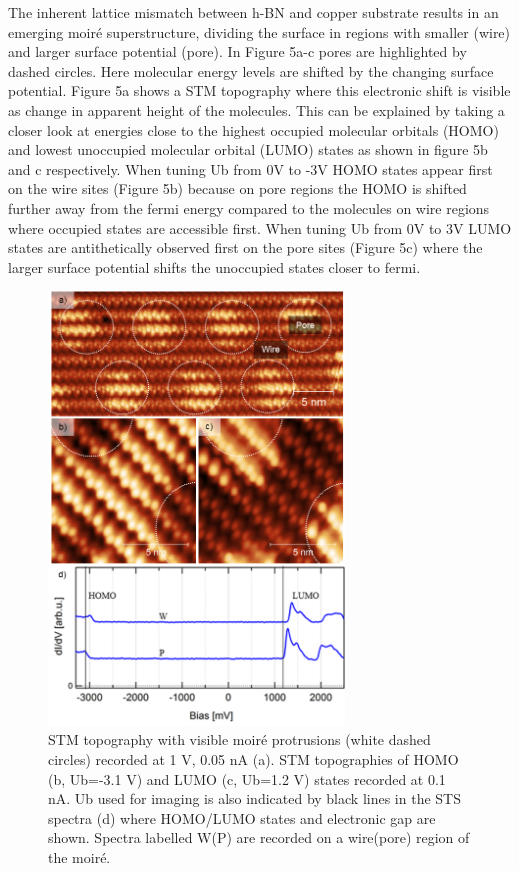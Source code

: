 The inherent lattice mismatch between h-BN and copper substrate results in an emerging moiré superstructure\cite{}, dividing the surface in regions with smaller (wire) and larger surface potential (pore)\cite{}. In Figure 5a-c pores are highlighted by dashed circles. Here molecular energy levels are shifted by the changing surface potential.\cite{} Figure 5a shows a STM topography where this electronic shift is visible as change in apparent height of the molecules. This can be explained by taking a closer look at energies close to the highest occupied molecular orbitals (HOMO) and lowest unoccupied molecular orbital (LUMO) states as shown in figure 5b and c respectively. When tuning Ub from 0V to -3V HOMO states appear first on the wire sites (Figure 5b) because on pore regions the HOMO is shifted further away from the fermi energy compared to the molecules on wire regions where occupied states are accessible first. When tuning Ub from 0V to 3V LUMO states are antithetically observed first on the pore sites (Figure 5c) where the larger surface potential shifts the unoccupied states closer to fermi.

\begin{figure} \centering
	\includegraphics[width=0.7\textwidth]{./images/paper/helicene/fig5}
	\caption{STM topography with visible moiré protrusions (white dashed circles) recorded at 1 V, 0.05 nA (a). STM topographies of HOMO (b, Ub=-3.1 V) and LUMO (c, Ub=1.2 V) states recorded at 0.1 nA. Ub used for imaging is also indicated by black lines in the STS spectra (d) where HOMO/LUMO states and electronic gap are shown. Spectra labelled W(P) are recorded on a wire(pore) region of the moiré.}
	\label{fig:hel-fig5}
\end{figure}



